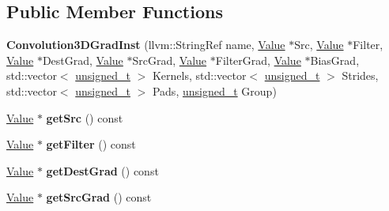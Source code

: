 \subsection*{Public Member Functions}
\begin{DoxyCompactItemize}
\item 
\mbox{\label{classglow_1_1_convolution3_d_grad_inst_aaf895d00039541cabe58d55fba133be3}} 
{\bfseries Convolution3\+D\+Grad\+Inst} (llvm\+::\+String\+Ref name, \hyperlink{classglow_1_1_value}{Value} $\ast$Src, \hyperlink{classglow_1_1_value}{Value} $\ast$Filter, \hyperlink{classglow_1_1_value}{Value} $\ast$Dest\+Grad, \hyperlink{classglow_1_1_value}{Value} $\ast$Src\+Grad, \hyperlink{classglow_1_1_value}{Value} $\ast$Filter\+Grad, \hyperlink{classglow_1_1_value}{Value} $\ast$Bias\+Grad, std\+::vector$<$ \hyperlink{namespaceglow_a0ca574644e1e42ef193a9947fb4d8911}{unsigned\+\_\+t} $>$ Kernels, std\+::vector$<$ \hyperlink{namespaceglow_a0ca574644e1e42ef193a9947fb4d8911}{unsigned\+\_\+t} $>$ Strides, std\+::vector$<$ \hyperlink{namespaceglow_a0ca574644e1e42ef193a9947fb4d8911}{unsigned\+\_\+t} $>$ Pads, \hyperlink{namespaceglow_a0ca574644e1e42ef193a9947fb4d8911}{unsigned\+\_\+t} Group)
\item 
\mbox{\label{classglow_1_1_convolution3_d_grad_inst_a0235bdb909367930b822d5d6d39d55f1}} 
\hyperlink{classglow_1_1_value}{Value} $\ast$ {\bfseries get\+Src} () const
\item 
\mbox{\label{classglow_1_1_convolution3_d_grad_inst_a677a515329bc6641d989bbdf4022de76}} 
\hyperlink{classglow_1_1_value}{Value} $\ast$ {\bfseries get\+Filter} () const
\item 
\mbox{\label{classglow_1_1_convolution3_d_grad_inst_aa0a9823b32ae7969c9cac5a11a9600bd}} 
\hyperlink{classglow_1_1_value}{Value} $\ast$ {\bfseries get\+Dest\+Grad} () const
\item 
\mbox{\label{classglow_1_1_convolution3_d_grad_inst_ac0e2545fa6a9a353762a8e9918fee465}} 
\hyperlink{classglow_1_1_value}{Value} $\ast$ {\bfseries get\+Src\+Grad} () const
\item 
\mbox{\label{classglow_1_1_convolution3_d_grad_inst_a282b633cbf9901bca789de238b04638c}} 

\end{DoxyCompactItemize}
